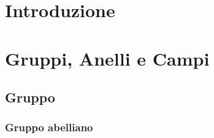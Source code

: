


\section{Introduzione}

\textsf{\small }


\newpage

\section{Gruppi, Anelli e Campi} %

\textsf{\small }



\subsection{Gruppo}

\subsubsection{Gruppo abelliano}

